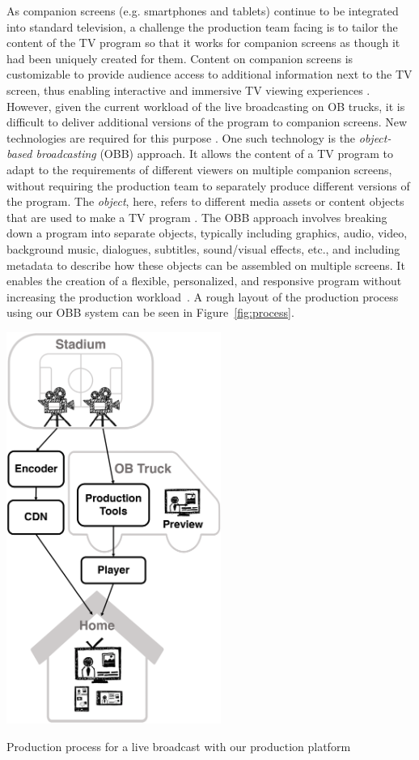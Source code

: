 \documentclass[sigchi-a, authorversion]{acmart}
\begin{document}
As companion screens (e.g. smartphones and tablets) continue to be integrated
into standard television, a challenge the production team facing is to tailor
the content of the TV program so that it works for companion screens as though
it had been uniquely created for them. Content on companion screens is
customizable to provide audience access to additional information next to the TV
screen, thus enabling interactive and immersive TV viewing
experiences \cite{bentley2017, dowell2015}. However, given the current workload
of the live broadcasting on OB trucks, it is difficult to deliver additional
versions of the program to companion screens. New technologies are required for
this purpose \cite{Li:2018_TVX, armstrong2014}. One such technology is the \emph{object-based broadcasting} (OBB) approach. It allows the content of a TV program to
adapt to the requirements of different viewers on multiple companion screens,
without requiring the production team to separately produce different versions
of the program. The \emph{object}, here, refers to different media assets or content
objects that are used to make a TV program \cite{armstrong2014}. The OBB approach
involves breaking down a program into separate objects, typically including
graphics, audio, video, background music, dialogues, subtitles, sound/visual
effects, etc., and including metadata to describe how these objects can be
assembled on multiple screens. It enables the creation of a flexible, personalized,
and responsive program without increasing the production
workload~\cite{kegel2017, armstrong2014}. A rough layout of the production process
using our OBB system can be seen in Figure~\ref{fig:process}.

\begin{marginfigure}
    \includegraphics[width=7cm]{Figures/process.png}
    \caption{Production process for a live broadcast with our production platform}
    \label{fig:process}
\end{marginfigure}
\end{document}
